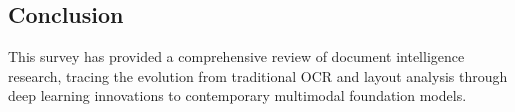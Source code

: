 \documentclass[]{style}
\begin{document}
\subsection{Conclusion}

This survey has provided a comprehensive review of document intelligence research, tracing the evolution from traditional OCR and layout analysis through deep learning innovations to contemporary multimodal foundation models.


\clearpage

\setlength{\bibhang}{0pt}
\setlength\bibindent{0pt}

\end{document}
